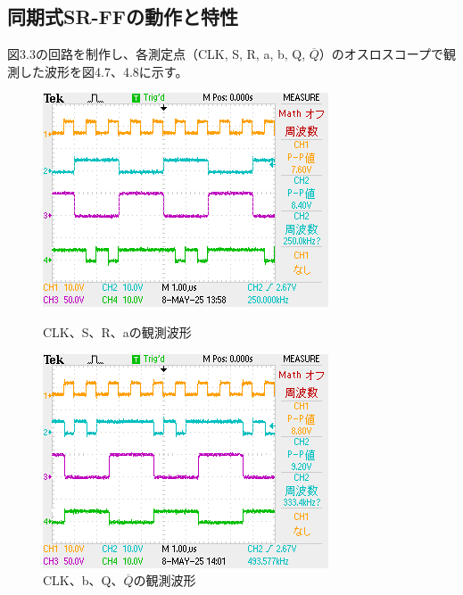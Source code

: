 \documentclass{jlreq}
\numberwithin{equation}{section}
\begin{document}
\subsection{同期式SR-FFの動作と特性}
図3.3の回路を制作し、各測定点（CLK, S, R, a, b, Q, \(\overline{Q}\)）のオスロスコープで観測した波形を図4.7、4.8に示す。

\begin{figure}[H]
  \centering
  \begin{minipage}{0.48\textwidth}
    \centering
    \includegraphics[width=\textwidth]{assets/srff01.png}
    \caption{CLK、S、R、aの観測波形}
  \end{minipage}
  \hfill
  \begin{minipage}{0.48\textwidth}
    \centering
    \includegraphics[width=\textwidth]{assets/srff02.png}
    \caption{CLK、b、Q、\(\overline{Q}\)の観測波形}
  \end{minipage}
\end{figure}
\end{document}
